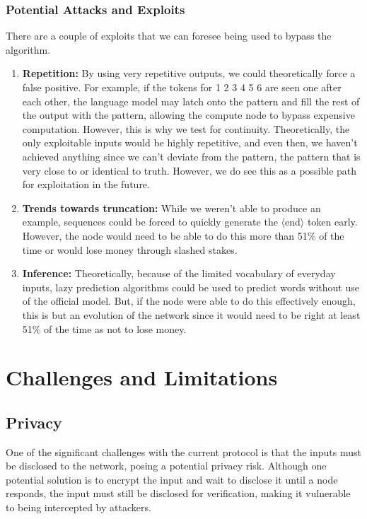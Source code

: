 \documentclass{article}
\begin{document}
\subsubsection*{Potential Attacks and Exploits}

There are a couple of exploits that we can foresee being used to bypass the algorithm.

\begin{enumerate}
    \item \textbf{Repetition:} By using very repetitive outputs, we could theoretically force a false positive. 
    For example, if the tokens for 1 2 3 4 5 6 are seen one after each other, the language model may latch onto the pattern and fill the rest of the output with the pattern, allowing the compute node to bypass expensive computation. 
    However, this is why we test for continuity. 
    Theoretically, the only exploitable inputs would be highly repetitive, and even then, we haven't achieved anything since we can't deviate from the pattern, the pattern that is very close to or identical to truth. 
    However, we do see this as a possible path for exploitation in the future.
    \item \textbf{Trends towards truncation:} While we weren't able to produce an example, sequences could be forced to quickly generate the $\langle$end$\rangle$ token early. 
    However, the node would need to be able to do this more than 51\% of the time or would lose money through slashed stakes.
    \item \textbf{Inference:} Theoretically, because of the limited vocabulary of everyday inputs, lazy prediction algorithms could be used to predict words without use of the official model.
     But, if the node were able to do this effectively enough, this is but an evolution of the network since it would need to be right at least 51\% of the time as not to lose money.
\end{enumerate}

\section{Challenges and Limitations}
\subsection{Privacy}
One of the significant challenges with the current protocol is that the inputs must be disclosed to the network, posing a potential privacy risk. 
Although one potential solution is to encrypt the input and wait to disclose it until a node responds, the input must still be disclosed for verification, making it vulnerable to being intercepted by attackers.
\end{document}
